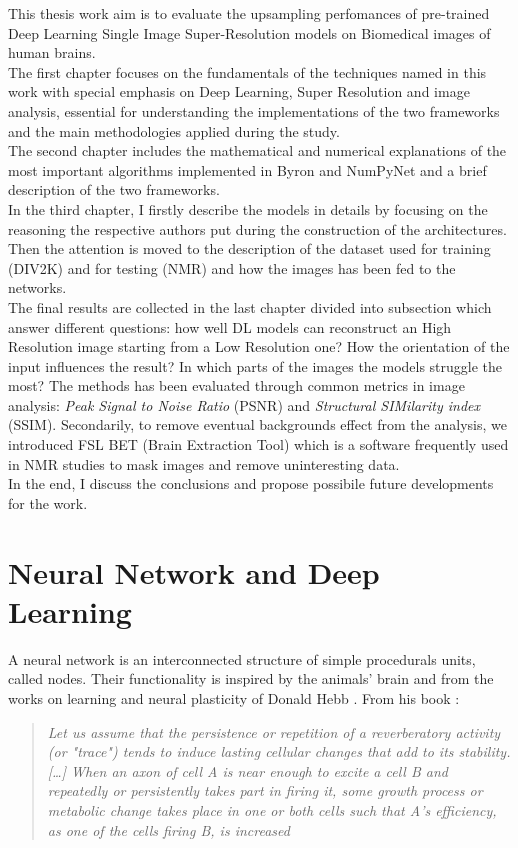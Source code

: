 \documentclass[12pt,a4paper]{report}
\begin{document}
This thesis work aim is to evaluate the upsampling perfomances of pre-trained Deep Learning Single Image Super-Resolution models on Biomedical images of human brains.
\\
The first chapter focuses on the fundamentals of the techniques named in this work with special emphasis on Deep Learning, Super Resolution and image analysis, essential for understanding the implementations of the two frameworks and the main methodologies applied during the study. 
\\
The second chapter includes the mathematical and numerical explanations of the most important algorithms implemented in Byron and NumPyNet and a brief description of the two frameworks. 
\\
In the third chapter, I firstly describe the models in details by focusing on the reasoning the respective authors put during the construction of the architectures. 
Then the attention is moved to the description of the dataset used for training (DIV2K) and for testing (NMR) and how the images has been fed to the networks. 
\\
The final results are collected in the last chapter divided into subsection which answer different questions: how well DL models can reconstruct an High Resolution image starting from a Low Resolution one? How the orientation of the input influences the result? In which parts of the images the models struggle the most? 
The methods has been evaluated through common metrics in image analysis: {\it Peak Signal to Noise Ratio} (PSNR) and {\it Structural SIMilarity index} (SSIM). 
Secondarily, to remove eventual backgrounds effect from the analysis, we introduced FSL BET (Brain Extraction Tool) which is a software frequently used in NMR studies to mask images and remove uninteresting data.
\\
In the end, I discuss the conclusions and propose possibile future developments for the work.

\section{Neural Network and Deep Learning}

  A neural network is an interconnected structure of simple procedurals units, called nodes. Their functionality is inspired by the animals' brain and from the works on learning and neural plasticity of Donald Hebb \cite{hebb-learning}. From his book :

\begin{quote}
 \begin{center}
  \textit{Let us assume that the persistence or repetition of a reverberatory activity (or "trace") tends to induce lasting cellular changes that add to its stability.[…] When an axon of cell A is near enough to excite a cell B and repeatedly or persistently takes part in firing it, some growth process or metabolic change takes place in one or both cells such that A's efficiency, as one of the cells firing B, is increased}
 \end{center}
\end{quote}
\end{document}
